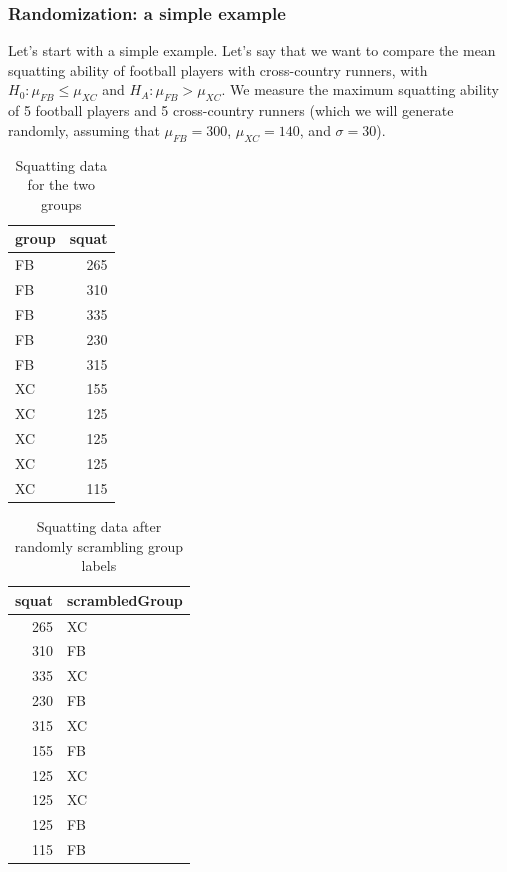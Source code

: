 \documentclass[12pt,]{book}
\theoremstyle{definition}
\theoremstyle{definition}
\theoremstyle{definition}
\theoremstyle{remark}
\begin{document}
\hypertarget{randomization-a-simple-example}{%
\subsubsection{Randomization: a simple example}\label{randomization-a-simple-example}}

Let's start with a simple example. Let's say that we want to compare the mean squatting ability of football players with cross-country runners, with \(H_0: \mu_{FB} \le \mu_{XC}\) and \(H_A: \mu_{FB} > \mu_{XC}\). We measure the maximum squatting ability of 5 football players and 5 cross-country runners (which we will generate randomly, assuming that \(\mu_{FB} = 300\), \(\mu_{XC} = 140\), and \(\sigma = 30\)).

\begin{table}

\caption{\label{tab:squatPlot}Squatting data for the two groups}
\centering
\begin{tabular}[t]{l|r}
\hline
group & squat\\
\hline
FB & 265\\
\hline
FB & 310\\
\hline
FB & 335\\
\hline
FB & 230\\
\hline
FB & 315\\
\hline
XC & 155\\
\hline
XC & 125\\
\hline
XC & 125\\
\hline
XC & 125\\
\hline
XC & 115\\
\hline
\end{tabular}
\end{table}

\begin{table}

\caption{\label{tab:squatPlot}Squatting data after randomly scrambling group labels}
\centering
\begin{tabular}[t]{r|l}
\hline
squat & scrambledGroup\\
\hline
265 & XC\\
\hline
310 & FB\\
\hline
335 & XC\\
\hline
230 & FB\\
\hline
315 & XC\\
\hline
155 & FB\\
\hline
125 & XC\\
\hline
125 & XC\\
\hline
125 & FB\\
\hline
115 & FB\\
\hline
\end{tabular}
\end{table}
\end{document}
